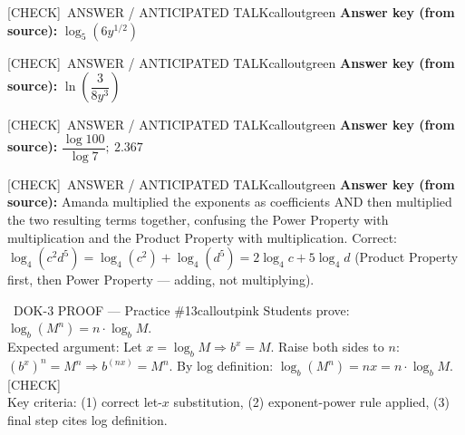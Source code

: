 \documentclass[11pt]{article}
\newcommand{\IconCheck}{[CHECK]}
\newcommand{\teacheranswerbox}[2]{%
  \begin{callout}{#1}{calloutgreen}
  #2
  \end{callout}
}
\begin{document}
\teacheranswerbox{\IconCheck\ ANSWER / ANTICIPATED TALK}{%
\textbf{Answer key (from source):} \(\log_5(6y^{1/2})\)
}


\teacheranswerbox{\IconCheck\ ANSWER / ANTICIPATED TALK}{%
\textbf{Answer key (from source):} \(\ln\!\left(\dfrac{3}{8y^3}\right)\)
}


\teacheranswerbox{\IconCheck\ ANSWER / ANTICIPATED TALK}{%
\textbf{Answer key (from source):} \(\dfrac{\log100}{\log7};\ 2.367\)
}


\teacheranswerbox{\IconCheck\ ANSWER / ANTICIPATED TALK}{%
\textbf{Answer key (from source):} Amanda multiplied the exponents as coefficients AND then multiplied the two resulting terms together, confusing the Power Property with multiplication and the Product Property with multiplication. Correct: \(\log_4(c^2 d^5) = \log_4(c^2) + \log_4(d^5) = 2\log_4 c + 5\log_4 d\) (Product Property first, then Power Property --- adding, not multiplying).
}


\begin{callout}{\IconStar\ DOK-3 PROOF --- Practice \#13}{calloutpink}
Students prove: \(\log_b(M^n) = n\cdot\log_b M\).\\
Expected argument: Let \(x = \log_b M \Rightarrow b^x = M\). Raise both sides to \(n\): \((b^x)^n = M^n \Rightarrow b^{(nx)} = M^n\). By log definition: \(\log_b(M^n) = nx = n\cdot\log_b M\). [CHECK]\\
Key criteria: (1) correct let-\(x\) substitution, (2) exponent-power rule applied, (3) final step cites log definition.
\end{callout}
\end{document}
